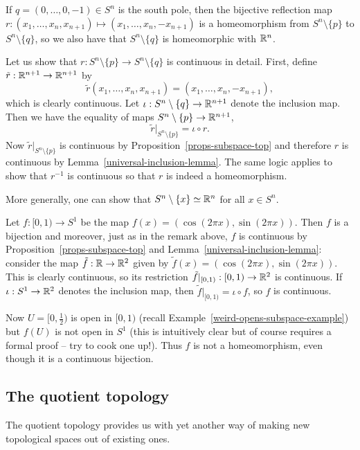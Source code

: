 \begin{rem}
  \label{south-pole-removed}
  If $q = (0,\dots,0,-1) \in S^n$ is the south pole, then the bijective reflection map $r: (x_1, \dots, x_n,x_{n+1}) \mapsto (x_1,\dots,x_n,-x_{n+1})$ is a homeomorphism from $S^n \setminus \{p\}$ to $S^n \setminus \{ q \}$, so we also have that $S^n \setminus \{ q \}$ is homeomorphic with $\mathbb{R}^n$.
  
  Let us show that $r : S^n \setminus \{p \} \to S^n \setminus \{q\}$ is continuous in detail. First, define $\tilde{r} : \mathbb{R}^{n+1} \to \mathbb{R}^{n+1}$ by
  \[
    \tilde{r}(x_1, \dots, x_n,x_{n+1}) = (x_1, \dots, x_n,-x_{n+1}),
  \]
  which is clearly continuous. Let $\iota : S^n \setminus \{q\} \to \mathbb{R}^{n+1}$ denote the inclusion map. Then we have the equality of maps $S^n \setminus \{p\} \to \mathbb{R}^{n+1}$,
  \[
    \tilde{r}|_{S^n \setminus \{p \}} = \iota \circ r.
  \]
  Now $\tilde{r}|_{S^n \setminus \{p \}}$ is continuous by Proposition~\ref{props-subspace-top} and therefore $r$ is continuous by Lemma~\ref{universal-inclusion-lemma}. The same logic applies to show that $r^{-1}$ is continuous so that $r$ is indeed a homeomorphism.
  
  More generally, one can show that $S^n \setminus \{x\} \simeq \mathbb{R}^n$ for all $x \in S^n$.
\end{rem}
\begin{example}
  Let $f : [0,1) \to S^1$ be the map $f(x) = (\cos (2\pi x), \sin(2\pi x))$. Then $f$ is a bijection and moreover, just as in the remark above, $f$ is continuous by Proposition~\ref{props-subspace-top} and Lemma~\ref{universal-inclusion-lemma}: consider the map $\tilde{f} : \mathbb{R} \to \mathbb{R}^2$ given by $\tilde{f}(x) = (\cos (2\pi x), \sin(2\pi x))$. This is clearly continuous, so its restriction $\tilde{f}|_{[0,1)} : [0,1) \to \mathbb{R}^2$ is continuous. If $\iota : S^1 \to \mathbb{R}^2$ denotes the inclusion map, then $\tilde{f}|_{[0,1)} = \iota \circ f$, so $f$ is continuous.
  
  Now $U = [0,\tfrac{1}{2})$ is open in $[0,1)$ (recall Example~\ref{weird-opens-subspace-example}) but $f(U)$ is not open in $S^1$ (this is intuitively clear but of course requires a formal proof -- try to cook one up!). Thus $f$ is not a homeomorphism, even though it is a continuous bijection.
\end{example}

\subsection{The quotient topology}
The quotient topology provides us with yet another way of making new topological spaces out of existing ones.

